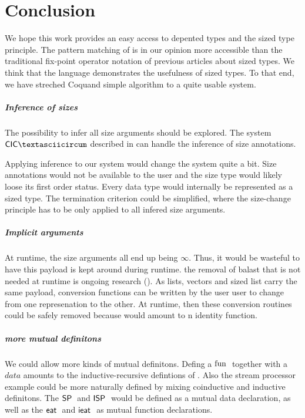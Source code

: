 \chapter{Conclusion}
We hope this work provides an easy access to depented types and the sized type principle.
The pattern matching of \mugda is in our opinion more accessible than the traditional fix-point operator
notation of previous articles about sized types.
We think that the \mugda language demonstrates the usefulness of sized types.
To that end, we have streched Coquand simple algorithm to a quite usable system.
\paragraph*{Inference of sizes}
The possibility to infer all size arguments should be explored.
The system $\mathsf{CIC\textasciicircum}$ described in \cite{bgp:lpar06} can handle the inference of size annotations. 

Applying inference to our system would change the system quite a bit.
Size annotations would not be available to the user and the size type would likely loose its first order status. Every data type would internally be represented as a sized type. The termination criterion could be simplified, where the size-change principle has to be only applied to all infered size arguments.
\paragraph*{Implicit arguments}
At runtime, the size arguments all end up being $\infty$.
Thus, it would be wasteful to have this payload is kept around during runtime. 
the removal of balast that is not needed at runtime is ongoing research (\cite{miquel01implicit,DBLP:conf/types/BradyMM03}).
As lists, vectors and sized list carry the same payload, conversion functions can be written by the user user to change from one represenation to the other. At runtime, then these conversion routines could be safely removed because would amount to n identity function.
\paragraph*{more mutual definitons}
We could allow more kinds of mutual definitons.
Defing a $\mathrm{fun}\;$ together with a $data$ amounts to the inductive-recursive defintions of \cite{dybier-}.
Also the stream processor example could be more naturally defined by mixing coinductive and inductive definitons.
The $\mathsf{SP}\;$ and $\mathsf{ISP}\;$ would be defined as a mutual data declaration, as well as the $\mathsf{eat}\; $ and $\mathsf{ieat}\;$ as mutual function declarations.

